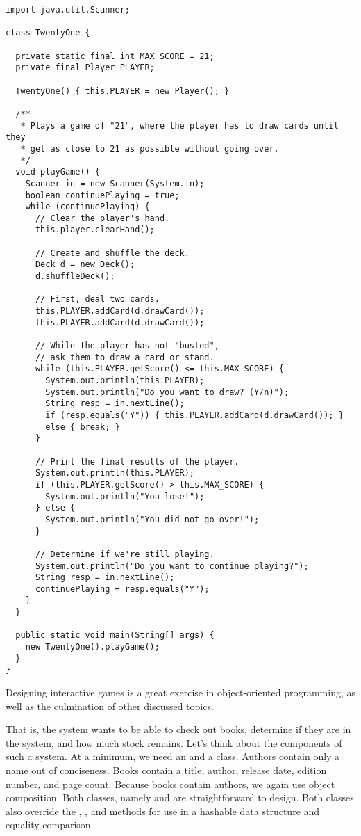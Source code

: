 \begin{lstlisting}[language=MyJava]
import java.util.Scanner;

class TwentyOne {

  private static final int MAX_SCORE = 21;
  private final Player PLAYER;

  TwentyOne() { this.PLAYER = new Player(); }

  /**
   * Plays a game of "21", where the player has to draw cards until they
   * get as close to 21 as possible without going over.
   */
  void playGame() {
    Scanner in = new Scanner(System.in);
    boolean continuePlaying = true;
    while (continuePlaying) {
      // Clear the player's hand.
      this.player.clearHand();

      // Create and shuffle the deck.
      Deck d = new Deck();
      d.shuffleDeck();

      // First, deal two cards.
      this.PLAYER.addCard(d.drawCard());
      this.PLAYER.addCard(d.drawCard());

      // While the player has not "busted", 
      // ask them to draw a card or stand.
      while (this.PLAYER.getScore() <= this.MAX_SCORE) {
        System.out.println(this.PLAYER);
        System.out.println("Do you want to draw? (Y/n)");
        String resp = in.nextLine();
        if (resp.equals("Y")) { this.PLAYER.addCard(d.drawCard()); }
        else { break; }
      }

      // Print the final results of the player.
      System.out.println(this.PLAYER);
      if (this.PLAYER.getScore() > this.MAX_SCORE) {
        System.out.println("You lose!");
      } else {
        System.out.println("You did not go over!");
      }

      // Determine if we're still playing.
      System.out.println("Do you want to continue playing?");
      String resp = in.nextLine();
      continuePlaying = resp.equals("Y");
    }
  }

  public static void main(String[] args) {
    new TwentyOne().playGame();
  }
}
\end{lstlisting}

Designing interactive games is a great exercise in object-oriented programming, as well as the culmination of other discussed topics.

That is, the system wants to be able to check out books, determine if they are in the system, and how much stock remains.
Let's think about the components of such a system.
At a minimum, we need an  and a  class.
Authors contain only a name out of conciseness.
Books contain a title, author, release date, edition number, and page count.
Because books contain authors, we again use object composition. 
Both classes, namely  and  are straightforward to design. Both classes also override the , , and  methods for use in a hashable data structure and equality comparison.

